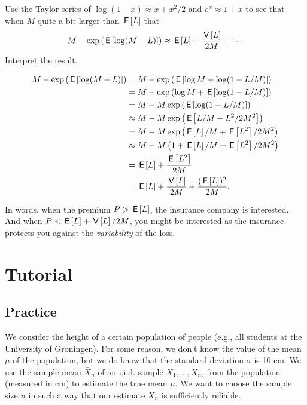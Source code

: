 \begin{exercise}
Use the Taylor series of $\log (1-x) \approx x + x^{2}/2$ and $e^{x} \approx 1+x $  to see that when $M$ quite a bit larger than $\,\mathsf{E}\left[L\right]$ that
\begin{equation}
  \label{eq:137}
M - \exp\left(\,\mathsf{E}\left[\log (M-L)\right]\right) \approx \,\mathsf{E}\left[L\right] + \frac{\,\mathsf{V}\left[L\right]}{2 M} + \cdots
\end{equation}
Interpret the result.
\begin{solution}
  \begin{align}
M - \exp\left(\,\mathsf{E}\left[\log (M-L)\right]\right)
&=  M - \exp\left(\,\mathsf{E}\left[\log M + \log (1-L/M)\right]\right)  \\
&=  M - \exp\left(\log M + \,\mathsf{E}\left[\log (1-L/M)\right]\right)  \\
&=  M - M \exp\left(\,\mathsf{E}\left[\log (1-L/M)\right]\right)  \\
&\approx  M - M \exp\left(\,\mathsf{E}\left[ L/M + L^{2}/2M^{2}\right]\right)  \\
&=  M - M \exp\left(\,\mathsf{E}\left[L\right]/M + \,\mathsf{E}\left[L^{2}\right]/2M^{2}\right)  \\
&\approx  M - M \left(1+ \,\mathsf{E}\left[L\right]/M + \,\mathsf{E}\left[L^{2}\right]/2M^{2}\right)  \\
&= \,\mathsf{E}\left[L\right]  + \frac{\,\mathsf{E}\left[L^{2}\right]}{2M} \\
&= \,\mathsf{E}\left[L\right] + \frac{\,\mathsf{V}\left[L\right]}{2M} + \frac{(\,\mathsf{E}\left[L\right])^{2}}{2M}.
  \end{align}

  In words, when the premium $P>\,\mathsf{E}\left[L\right]$, the insurance company is interested.
  And when $P< \,\mathsf{E}\left[L\right] + \,\mathsf{V}\left[L\right]/2M$, you might be interested as the insurance protects you against the \emph{variability} of the loss.

\end{solution}
\end{exercise}


\section{Tutorial}
\label{sec:tutorial}


\subsection{Practice}

We consider the height of a certain population of people (e.g., all students at the University of Groningen). For some reason, we don't know the value of the mean $\mu$ of the population, but we do know that the standard deviation $\sigma$ is 10 cm. We use the sample mean $\bar{X}_n$ of an i.i.d. sample $X_1, \ldots, X_n$, from the population (measured in cm) to estimate the true mean $\mu$.  We want to choose the sample size $n$ in such a way that our estimate $\bar{X}_n$ is sufficiently reliable.

